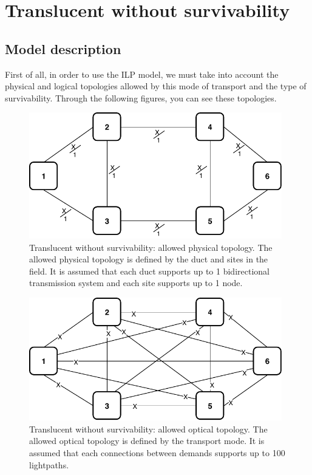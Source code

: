 
\section{Translucent without survivability}\label{ILP_Transluc_Survivability}

\subsection{Model description}

First of all, in order to use the ILP model, we must take into account the physical and logical topologies allowed by this mode of transport and the type of survivability. Through the following figures, you can see these topologies. \\

\begin{figure}[h!]
\centering
\includegraphics[width=11cm]{sdf/ilp/translucent_survivability/figures/allowed_physical_topology}
\caption{Translucent without survivability: allowed physical topology. The allowed physical topology is defined by the duct and sites in the field. It is assumed that each duct supports up to 1 bidirectional transmission system and each site supports up to 1 node.}
\label{allowed3_physical_low}
\end{figure}

\newpage
\begin{figure}[h!]
\centering
\includegraphics[width=11cm]{sdf/ilp/translucent_survivability/figures/allowed_optical_topology}
\caption{Translucent without survivability: allowed optical topology. The allowed optical topology is defined by the transport mode. It is assumed that each connections between demands supports up to 100 lightpaths.}
\label{allowed3_optical_low}
\end{figure}

